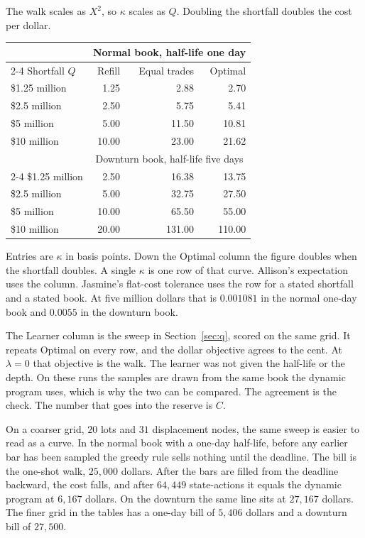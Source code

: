 \documentclass[11pt]{article}
\begin{document}
The walk scales as \(X^{2}\), so \(\kappa\) scales as \(Q\). Doubling the shortfall doubles the cost per dollar.

\begin{center}
\small
\begin{tabular}{@{}lrrr@{}}
\toprule
& \multicolumn{3}{c}{Normal book, half-life one day} \\
\cmidrule(lr){2-4}
Shortfall \(Q\) & Refill & Equal trades & Optimal \\
\midrule
\$1.25 million & 1.25 & 2.88 & 2.70 \\
\$2.5 million  & 2.50 & 5.75 & 5.41 \\
\$5 million    & 5.00 & 11.50 & 10.81 \\
\$10 million   & 10.00 & 23.00 & 21.62 \\
\midrule
& \multicolumn{3}{c}{Downturn book, half-life five days} \\
\cmidrule(lr){2-4}
\$1.25 million & 2.50 & 16.38 & 13.75 \\
\$2.5 million  & 5.00 & 32.75 & 27.50 \\
\$5 million    & 10.00 & 65.50 & 55.00 \\
\$10 million   & 20.00 & 131.00 & 110.00 \\
\bottomrule
\end{tabular}
\end{center}

Entries are \(\kappa\) in basis points. Down the Optimal column the figure doubles when the shortfall doubles. A single \(\kappa\) is one row of that curve. Allison's expectation uses the column. Jasmine's flat-cost tolerance uses the row for a stated shortfall and a stated book. At five million dollars that is \(0.001081\) in the normal one-day book and \(0.0055\) in the downturn book.

The Learner column is the sweep in Section~\ref{sec:q}, scored on the same grid. It repeats Optimal on every row, and the dollar objective agrees to the cent. At \(\lambda = 0\) that objective is the walk. The learner was not given the half-life or the depth. On these runs the samples are drawn from the same book the dynamic program uses, which is why the two can be compared. The agreement is the check. The number that goes into the reserve is \(C\).

On a coarser grid, \(20\) lots and \(31\) displacement nodes, the same sweep is easier to read as a curve. In the normal book with a one-day half-life, before any earlier bar has been sampled the greedy rule sells nothing until the deadline. The bill is the one-shot walk, \(25{,}000\) dollars. After the bars are filled from the deadline backward, the cost falls, and after \(64{,}449\) state-actions it equals the dynamic program at \(6{,}167\) dollars. On the downturn the same line sits at \(27{,}167\) dollars. The finer grid in the tables has a one-day bill of \(5{,}406\) dollars and a downturn bill of \(27{,}500\).
\end{document}
